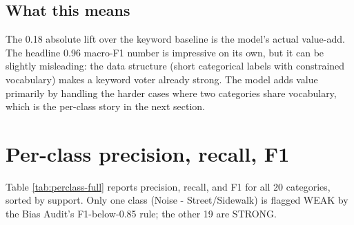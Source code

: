 \documentclass[11pt,letterpaper]{book}
\begin{document}
\subsection*{What this means}

The 0.18 absolute lift over the keyword baseline is the model's actual value-add. The headline 0.96 macro-F1 number is impressive on its own, but it can be slightly misleading: the data structure (short categorical labels with constrained vocabulary) makes a keyword voter already strong. The model adds value primarily by handling the harder cases where two categories share vocabulary, which is the per-class story in the next section.

\section{Per-class precision, recall, F1}
\label{sec:results-perclass}

Table \ref{tab:perclass-full} reports precision, recall, and F1 for all 20 categories, sorted by support. Only one class (Noise - Street/Sidewalk) is flagged WEAK by the Bias Audit's F1-below-0.85 rule; the other 19 are STRONG.
\end{document}
